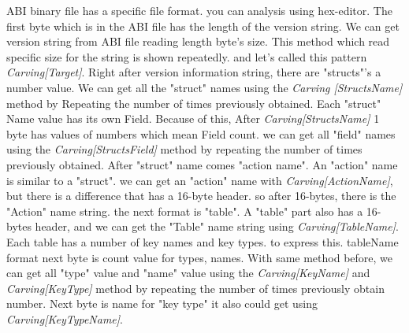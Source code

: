 ABI binary file has a specific file format. you can analysis using hex-editor. 
The first byte which is in the ABI file has the length of the version string. We can get version string from ABI file reading length byte's size. This method which read specific size for the string is shown repeatedly. and let's called this pattern  \textit{ Carving[Target]}. Right after version information string, there are "structs"'s a number value. We can get all the "struct" names using the \textit {Carving [StructsName]} method by Repeating the number of times previously obtained.
Each "struct" Name value has its own Field.
Because of this, After \textit{Carving[StructsName]} 1 byte has values of numbers which mean Field count. we can get all "field" names using the \textit{Carving[StructsField]} method by repeating the number of times previously obtained. 
After "struct" name comes "action name". 
An "action" name is similar to a "struct". we can get an "action" name with \textit{Carving[ActionName]}, but there is a difference that has a 16-byte header. so after 16-bytes, there is the "Action" name string.
the next format is "table".
A "table" part also has a 16-bytes header, and we can get the "Table" name string using \textit{Carving[TableName]}.
Each table has a number of key names and key types. to express this. tableName format next byte is count value for types, names. With same method before, we can get all "type" value and "name" value using the \textit{Carving[KeyName]} and \textit{Carving[KeyType]} method by repeating the number of times previously obtain number. Next byte is name for "key type" it also could get using \textit{Carving[KeyTypeName]}.



